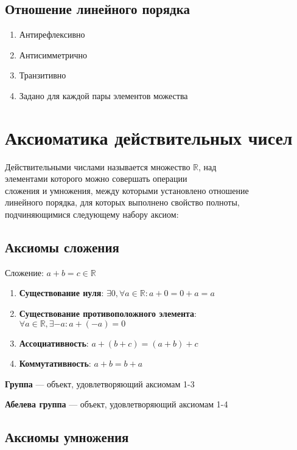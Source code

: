 \documentclass{article}
\begin{document}
\subsection{Отношение линейного порядка}

\begin{enumerate}
	\item Антирефлексивно
	\item Антисимметрично
	\item Транзитивно
	\item Задано для каждой пары элементов можества
\end{enumerate}

\pagebreak
\section{Аксиоматика действительных чисел}

Действительными числами называется множество $\mathbb{R}$, над \\
элементами которого можно совершать операции \\
сложения и умножения, между которыми установлено отношение \\
линейного порядка, для которых выполнено свойство полноты, \\
подчиняющимися следующему набору аксиом:

\subsection{Аксиомы сложения}

Сложение: $a + b = c \in \mathbb{R}$

\begin{enumerate}
	\item \textbf{Существование нуля}: $\exists 0, \forall a \in \mathbb{R} : a + 0 = 0 + a = a$
	\item \textbf{Существование противоположного элемента}: \\
	$\forall a \in \mathbb{R}, \exists {-a} : a + (-a) = 0$
	\item \textbf{Ассоциативность}: $a + (b + c) = (a + b) + c$
	\item \textbf{Коммутативность}: $a + b = b + a$
\end{enumerate}

\textbf{Группа} --- объект, удовлетворяющий аксиомам 1-3

\textbf{Абелева группа} --- объект, удовлетворяющий аксиомам 1-4

\subsection{Аксиомы умножения}
\end{document}
